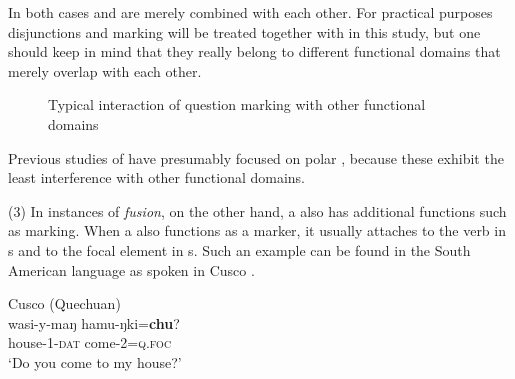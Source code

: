\noindent In both cases  and  are merely combined with each other. For practical purposes disjunctions and  marking will be treated together with  in this study, but one should keep in mind that they really belong to different functional domains that merely overlap with each other.

\begin{figure}
\caption{Typical interaction of question marking with other functional domains}
\label{fig:4:2}
\end{figure}

Previous studies of  have presumably focused on polar , because these exhibit the least interference with other functional domains.

         (3) In instances of \textit{fusion}, on the other hand, a  also has additional functions such as  marking. When a  also functions as a  marker, it usually attaches to the verb in s and to the focal element in s. Such an example can be found in the South American language  as spoken in Cusco .

\ea%
    \label{ex:4:34}
    Cusco  (Quechuan)\\
    \ea
    \gll wasi-y-maŋ  hamu-ŋki=\textbf{{chu}}?\\
    house-1-\textsc{dat}  come-2=\textsc{q.foc}\\
    \glt ‘Do you come to my house?’

